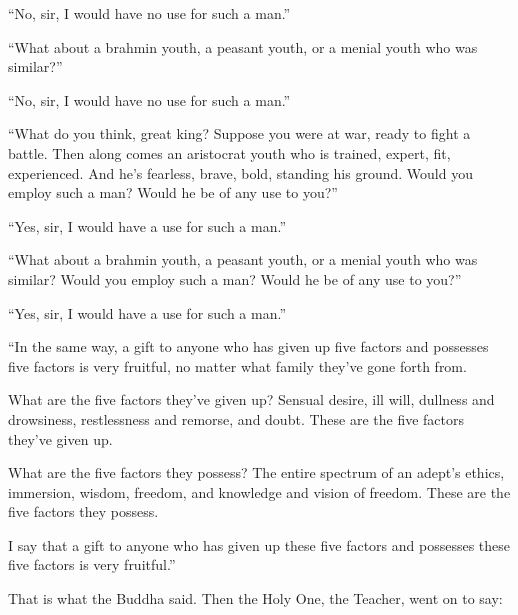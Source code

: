 \documentclass[12pt,openany]{book}%
\begin{document}
“No, sir, I would have no use for such a man.” 

“What about a brahmin youth, a peasant youth, or a menial youth who was similar?” 

“No, sir, I would have no use for such a man.” 

“What do you think, great king? Suppose you were at war, ready to fight a battle. Then along comes an aristocrat youth who is trained, expert, fit, experienced. And he’s fearless, brave, bold, standing his ground. Would you employ such a man? Would he be of any use to you?” 

“Yes, sir, I would have a use for such a man.” 

“What about a brahmin youth, a peasant youth, or a menial youth who was similar? Would you employ such a man? Would he be of any use to you?” 

“Yes, sir, I would have a use for such a man.” 

“In the same way, a gift to anyone who has given up five factors and possesses five factors is very fruitful, no matter what family they’ve gone forth from. 

What are the five factors they’ve given up? Sensual desire, ill will, dullness and drowsiness, restlessness and remorse, and doubt. These are the five factors they’ve given up. 

What are the five factors they possess? The entire spectrum of an adept’s ethics, immersion, wisdom, freedom, and knowledge and vision of freedom. These are the five factors they possess. 

I say that a gift to anyone who has given up these five factors and possesses these five factors is very fruitful.” 

That is what the Buddha said. Then the Holy One, the Teacher, went on to say: 
\end{document}
